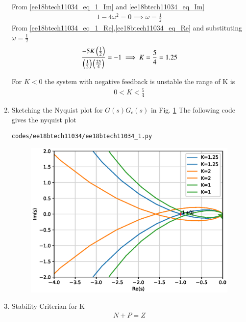 \begin{enumerate}[label=\thesubsection.\arabic*.,ref=\thesubsection.\theenumi]
From \eqref{ee18btech11034_eq_1_Im} and \eqref{ee18btech11034_eq_Im}
\begin{align}
    1-4\omega^2 = 0
    \implies \omega = \frac{1}{2} 
\end{align}
From  \eqref{ee18btech11034_eq_1_Re},\eqref{ee18btech11034_eq_Re} and substituting $\omega = \frac{1}{2}$
\begin{align}
    \frac{-5K\left(\frac{1}{2}\right)}{\left(\frac{1}{2}\right)\left(\frac{25}{4}\right)} = -1
    \implies K = \frac{5}{4} = 1.25
\end{align}

For $K < 0$ the system with negative feedback is unstable the range of K is 
\begin{align}
    0 < K < \frac{5}{4}
\end{align}
\item Sketching the Nyquist plot for $G(s)G_c(s)$ in Fig. \ref{fig:ee18btech11034_1}
The following code gives the nyquist plot
\begin{lstlisting}
codes/ee18btech11034/ee18btech11034_1.py
\end{lstlisting}
\begin{figure}[!h]
\centering
\includegraphics[width=\columnwidth]{./figs/ee18btech11034/ee18btech11034_1.eps}
\caption{}
\label{fig:ee18btech11034_1}
\end{figure}
\item Stability Criterian for K
\begin{align}
    N + P = Z
    \label{ee18btech11034_Z}
\end{align}
\begin{table}[!ht]
\centering

\caption{}
\label{table:ee18btech11034_table1}
\end{table}


\end{enumerate}
